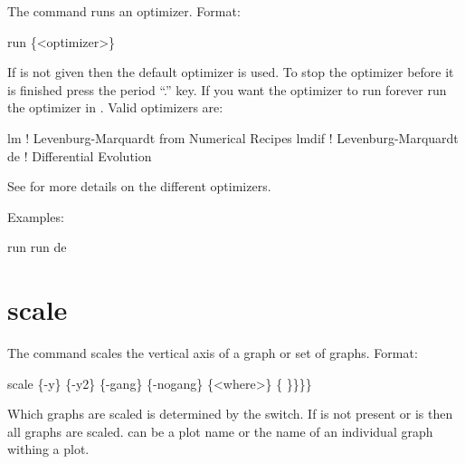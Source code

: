 The  command runs an optimizer. Format:
\begin{example}
  run \{<optimizer>\}
\end{example}

\vskip 0.2in 

If  is not given then the default optimizer is
used. To stop the optimizer before it is finished press the period
``.''  key. If you want the optimizer to run forever run the optimizer
in . Valid optimizers are:
\begin{example}
  lm            ! Levenburg-Marquardt from Numerical Recipes 
  lmdif         ! Levenburg-Marquardt 
  de            ! Differential Evolution
\end{example}
See  for more details on the different
optimizers.

Examples:
\begin{example}
  run 
  run de
\end{example}

\section{scale}
\label{s:scale}

The  command scales the vertical axis of a graph or set of graphs.
Format:
\begin{example}
  scale \{-y\} \{-y2\} \{-gang\} \{-nogang\} \{<where>\} \{<value1> \}<value2>\}\}\}
\end{example}

Which graphs are scaled is determined by the  switch. If
 is not present or  is  then all
graphs are scaled.  can be a plot name or the name of an
individual graph withing a plot.

